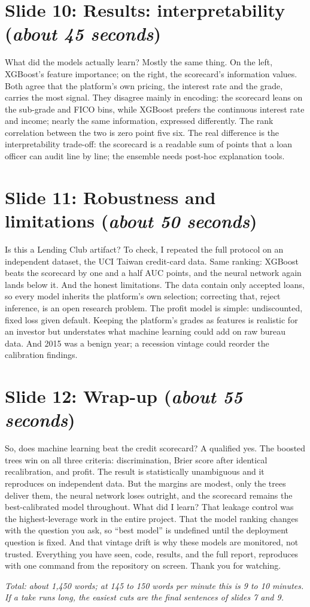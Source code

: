 \documentclass[a4paper,11pt]{article}
\newcommand{\slideblock}[3]{%
  \section*{Slide #1: #2 \hfill \normalfont\small(\textit{#3})}}
\begin{document}
\slideblock{10}{Results: interpretability}{about 45 seconds}
What did the models actually learn? Mostly the same thing. On the left, XGBoost's feature importance; on the right, the scorecard's information values. Both agree that the platform's own pricing, the interest rate and the grade, carries the most signal. They disagree mainly in encoding: the scorecard leans on the sub-grade and FICO bins, while XGBoost prefers the continuous interest rate and income; nearly the same information, expressed differently. The rank correlation between the two is zero point five six. The real difference is the interpretability trade-off: the scorecard is a readable sum of points that a loan officer can audit line by line; the ensemble needs post-hoc explanation tools.

\slideblock{11}{Robustness and limitations}{about 50 seconds}
Is this a Lending Club artifact? To check, I repeated the full protocol on an independent dataset, the UCI Taiwan credit-card data. Same ranking: XGBoost beats the scorecard by one and a half AUC points, and the neural network again lands below it. And the honest limitations. The data contain only accepted loans, so every model inherits the platform's own selection; correcting that, reject inference, is an open research problem. The profit model is simple: undiscounted, fixed loss given default. Keeping the platform's grades as features is realistic for an investor but understates what machine learning could add on raw bureau data. And 2015 was a benign year; a recession vintage could reorder the calibration findings.

\slideblock{12}{Wrap-up}{about 55 seconds}
So, does machine learning beat the credit scorecard? A qualified yes. The boosted trees win on all three criteria: discrimination, Brier score after identical recalibration, and profit. The result is statistically unambiguous and it reproduces on independent data. But the margins are modest, only the trees deliver them, the neural network loses outright, and the scorecard remains the best-calibrated model throughout. What did I learn? That leakage control was the highest-leverage work in the entire project. That the model ranking changes with the question you ask, so ``best model'' is undefined until the deployment question is fixed. And that vintage drift is why these models are monitored, not trusted. Everything you have seen, code, results, and the full report, reproduces with one command from the repository on screen. Thank you for watching.

\vspace{6mm}
\noindent\textit{Total: about 1,450 words; at 145 to 150 words per minute this is 9 to 10 minutes. If a take runs long, the easiest cuts are the final sentences of slides 7 and 9.}
\end{document}
